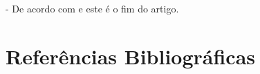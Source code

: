 \documentclass[a4paper,10pt]{article}  %
\begin{document}
   - De acordo com \cite{benante2008phd} e este é o fim do artigo.


\section{Referências Bibliográficas}

\nocite{*}


%



\end{document}
